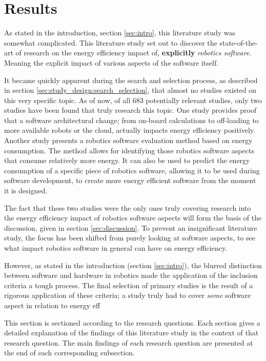 \section{Results}
\label{sec:results}
As stated in the introduction, section \ref{sec:intro}, this literature study was somewhat complicated.
This literature study set out to discover the state-of-the-art of research on the energy efficiency impact of, \textbf{explicitly} \textit{robotics software}.
Meaning the explicit impact of various aspects of the software itself.

It became quickly apparent during the search and selection process, as described in section \ref{sec:study_design:search_selection}, 
that almost no studies existed on this very specific topic.
As of now, of all 683 potentially relevant studies, only two studies have been found that truly research this topic.
One study \cite{rahman2019cloud_robot_offloading} provides proof that a software architectural change; 
from on-board calculations to off-loading to more available robots or the cloud, actually impacts energy efficiency positively.
Another study \cite{hou2017novel_cloud_evaluation_model} presents a robotics software evaluation method based on energy consumption.
The method allows for identifying those robotics software aspects that consume relatively more energy. 
It can also be used to predict the energy consumption of a specific piece of robotics software, allowing it to be used during software development, 
to create more energy efficient software from the moment it is designed.

The fact that these two studies were the only ones truly covering research into the energy efficiency impact of robotics software aspects will
form the basis of the discussion, given in section \ref{sec:discussion}.
To prevent an insignificant literature study, the focus has been shifted from purely looking at software aspects, to see what impact 
robotics software in general can have on energy efficiency.

However, as stated in the introduction (section \ref{sec:intro}), the blurred distinction between software and hardware in robotics made the 
application of the inclusion criteria a tough process.
The final selection of primary studies is the result of a rigorous application of these criteria; 
a study truly had to cover \textit{some} software aspect in relation to energy eff

\vspace{5mm}

This section is sectioned according to the research questions.
Each section gives a detailed explanation of the findings of this literature study in the context of that research question.
The main findings of each research question are presented at the end of each corresponding subsection.

